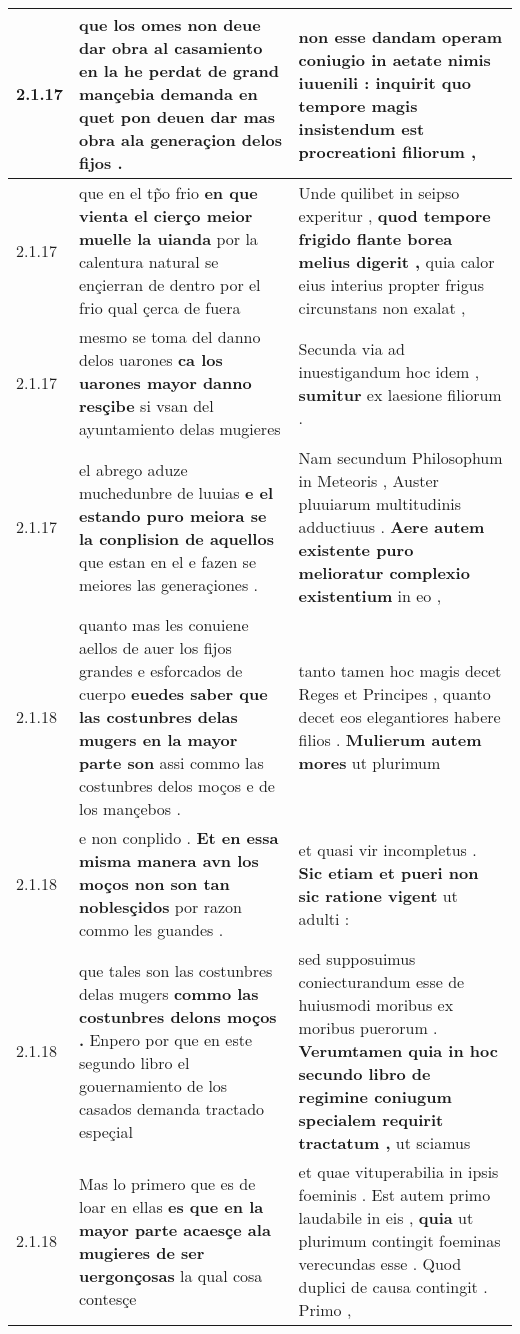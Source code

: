\begin{tabular}{|p{1cm}|p{6.5cm}|p{6.5cm}|}
2.1.17 & que los omes non deue dar obra al casamiento \textbf{ en la he perdat de grand mançebia demanda } en quet pon deuen dar mas obra ala generaçion delos fijos . & non esse dandam \textbf{ operam coniugio in aetate nimis iuuenili : } inquirit quo tempore magis insistendum est procreationi filiorum , \\\hline
2.1.17 & que en el tp̃o frio \textbf{ en que vienta el cierço meior muelle la uianda } por la calentura natural se ençierran de dentro por el frio qual çerca de fuera & Unde quilibet in seipso experitur , \textbf{ quod tempore frigido flante borea melius digerit , } quia calor eius interius propter frigus circunstans non exalat , \\\hline
2.1.17 & mesmo se toma del danno delos uarones \textbf{ ca los uarones mayor danno resçibe } si vsan del ayuntamiento delas mugieres & Secunda via ad inuestigandum hoc idem , \textbf{ sumitur } ex laesione filiorum . \\\hline
2.1.17 & el abrego aduze muchedunbre de luuias \textbf{ e el estando puro meiora se la conplision de aquellos } que estan en el e fazen se meiores las generaçiones . & Nam secundum Philosophum in Meteoris , Auster pluuiarum multitudinis adductiuus . \textbf{ Aere autem existente puro melioratur complexio existentium } in eo , \\\hline
2.1.18 & quanto mas les conuiene aellos de auer los fijos grandes e esforcados de cuerpo \textbf{ euedes saber que las costunbres delas mugers en la mayor parte son } assi commo las costunbres delos moços e de los mançebos . & tanto tamen hoc magis decet Reges et Principes , quanto decet eos elegantiores habere filios . \textbf{ Mulierum autem mores } ut plurimum \\\hline
2.1.18 & e non conplido . \textbf{ Et en essa misma manera avn los moços non son tan noblesçidos } por razon commo les guandes . & et quasi vir incompletus . \textbf{ Sic etiam et pueri non sic ratione vigent } ut adulti : \\\hline
2.1.18 & que tales son las costunbres delas mugers \textbf{ commo las costunbres delons moços . } Enpero por que en este segundo libro el gouernamiento de los casados demanda tractado espeçial & sed supposuimus coniecturandum esse de huiusmodi moribus ex moribus puerorum . \textbf{ Verumtamen quia in hoc secundo libro de regimine coniugum specialem requirit tractatum , } ut sciamus \\\hline
2.1.18 & Mas lo primero que es de loar en ellas \textbf{ es que en la mayor parte acaesçe ala mugieres de ser uergonçosas } la qual cosa contesçe & et quae vituperabilia in ipsis foeminis . Est autem primo laudabile in eis , \textbf{ quia } ut plurimum contingit foeminas verecundas esse . Quod duplici de causa contingit . Primo , \\\hline

\end{tabular}
